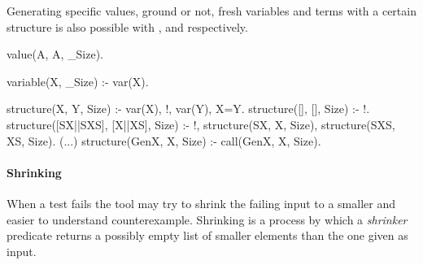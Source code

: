 Generating specific values, ground or not, fresh variables and terms
with a certain structure is also possible with ,
 and  respectively.
%
\begin{yapcode}
 value(A, A, _Size).

 variable(X, _Size) :- var(X).

 structure(X, Y, Size) :- var(X), !, var(Y), X=Y.
 structure([], [], Size) :- !.
 structure([SX||SXS], [X||XS], Size) :-
   !, structure(SX, X, Size), structure(SXS, XS, Size).
 (...)
 structure(GenX, X, Size) :- call(GenX, X, Size).
\end{yapcode}





\paragraph{\bf Shrinking}

When a test fails the tool may try to shrink the failing input to a
smaller and easier to understand counterexample.
%
Shrinking is a process by which a \emph{shrinker} predicate returns a
possibly empty list of smaller elements than the one given as input.


